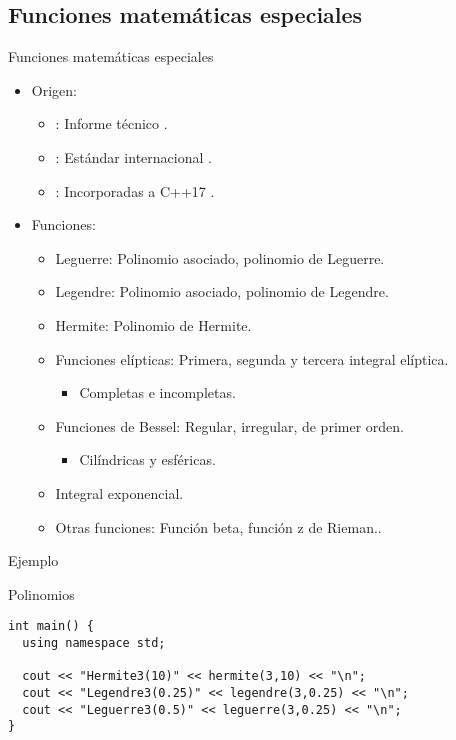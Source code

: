\subsection{Funciones matemáticas especiales}

\begin{frame}[t]{Funciones matemáticas especiales}
\begin{itemize}
  \item Origen:
    \begin{itemize}
      \item {}: Informe técnico .
      \item {}: Estándar internacional .
      \item {}: Incorporadas a C++17 .
    \end{itemize}

  \vfill\pause
  \item Funciones:
    \begin{itemize}
      \item Leguerre: Polinomio asociado, polinomio de Leguerre.
      \item Legendre: Polinomio asociado, polinomio de Legendre.
      \item Hermite: Polinomio de Hermite.
      \item Funciones elípticas: Primera, segunda y tercera integral elíptica.
        \begin{itemize}
          \item Completas e incompletas.
        \end{itemize}
      \item Funciones de Bessel: Regular, irregular, de primer orden.
        \begin{itemize}
          \item Cilíndricas y esféricas.
        \end{itemize}
      \item Integral exponencial.
      \item Otras funciones: Función beta, función z de Rieman.. 
    \end{itemize}
  
\end{itemize}
\end{frame}

\begin{frame}[t,fragile]{Ejemplo}
\begin{block}{Polinomios}
\begin{lstlisting}
int main() {
  using namespace std;

  cout << "Hermite3(10)" << hermite(3,10) << "\n";
  cout << "Legendre3(0.25)" << legendre(3,0.25) << "\n";
  cout << "Leguerre3(0.5)" << leguerre(3,0.25) << "\n";
}
\end{lstlisting}
\end{block}
\end{frame}
